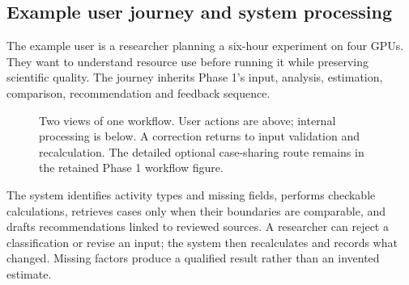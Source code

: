\subsection{Example user journey and system processing}
The example user is a researcher planning a six-hour experiment on four GPUs. They want to understand resource use before running it while preserving scientific quality. The journey inherits Phase 1's input, analysis, estimation, comparison, recommendation and feedback sequence.
\begin{figure}[H]
\centering
{}
\caption{Two views of one workflow. User actions are above; internal processing is below. A correction returns to input validation and recalculation. The detailed optional case-sharing route remains in the retained Phase 1 workflow figure.}
\label{fig:phase2-two-lanes}
\end{figure}
The system identifies activity types and missing fields, performs checkable calculations, retrieves cases only when their boundaries are comparable, and drafts recommendations linked to reviewed sources. A researcher can reject a classification or revise an input; the system then recalculates and records what changed. Missing factors produce a qualified result rather than an invented estimate.

